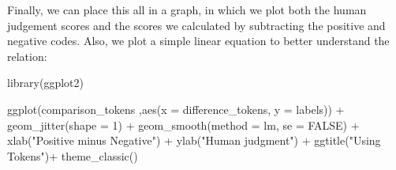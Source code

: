 \documentclass[
]{article}
\newenvironment{Shaded}{\begin{snugshade}}{\end{snugshade}}
\newcommand{\AttributeTok}[1]{\textcolor[rgb]{0.77,0.63,0.00}{#1}}
\newcommand{\ConstantTok}[1]{\textcolor[rgb]{0.00,0.00,0.00}{#1}}
\newcommand{\DecValTok}[1]{\textcolor[rgb]{0.00,0.00,0.81}{#1}}
\newcommand{\FunctionTok}[1]{\textcolor[rgb]{0.00,0.00,0.00}{#1}}
\newcommand{\NormalTok}[1]{#1}
\newcommand{\OtherTok}[1]{\textcolor[rgb]{0.56,0.35,0.01}{#1}}
\newcommand{\SpecialCharTok}[1]{\textcolor[rgb]{0.00,0.00,0.00}{#1}}
\newcommand{\StringTok}[1]{\textcolor[rgb]{0.31,0.60,0.02}{#1}}
\begin{document}
\begin{Shaded}
\end{Shaded}

Finally, we can place this all in a graph, in which we plot both the human judgement scores and the scores we calculated by subtracting the positive and negative codes. Also, we plot a simple linear equation to better understand the relation:

\begin{Shaded}
\begin{Highlighting}[]
\FunctionTok{library}\NormalTok{(ggplot2)}

\FunctionTok{ggplot}\NormalTok{(comparison\_tokens ,}\FunctionTok{aes}\NormalTok{(}\AttributeTok{x =}\NormalTok{ difference\_tokens, }\AttributeTok{y =}\NormalTok{ labels)) }\SpecialCharTok{+}
 \FunctionTok{geom\_jitter}\NormalTok{(}\AttributeTok{shape =} \DecValTok{1}\NormalTok{) }\SpecialCharTok{+}
 \FunctionTok{geom\_smooth}\NormalTok{(}\AttributeTok{method =}\NormalTok{ lm, }\AttributeTok{se =} \ConstantTok{FALSE}\NormalTok{) }\SpecialCharTok{+}
 \FunctionTok{xlab}\NormalTok{(}\StringTok{"Positive minus Negative"}\NormalTok{) }\SpecialCharTok{+}
 \FunctionTok{ylab}\NormalTok{(}\StringTok{"Human judgment"}\NormalTok{) }\SpecialCharTok{+}
 \FunctionTok{ggtitle}\NormalTok{(}\StringTok{"Using Tokens"}\NormalTok{)}\SpecialCharTok{+}
 \FunctionTok{theme\_classic}\NormalTok{()}
\end{Highlighting}
\end{Shaded}
\end{document}
